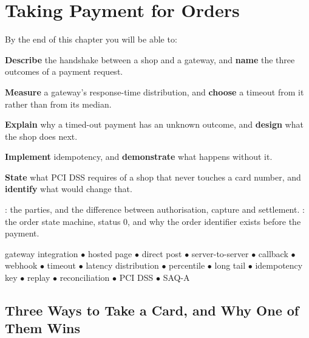 \chapter{Taking Payment for Orders}\label{ch:gateway}

\begin{outcomes}
By the end of this chapter you will be able to:
\begin{tight}
  \item \textbf{Describe} the handshake between a shop and a gateway, and
        \textbf{name} the three outcomes of a payment request.
  \item \textbf{Measure} a gateway's response-time distribution, and
        \textbf{choose} a timeout from it rather than from its median.
  \item \textbf{Explain} why a timed-out payment has an unknown outcome, and
        \textbf{design} what the shop does next.
  \item \textbf{Implement} idempotency, and \textbf{demonstrate} what happens
        without it.
  \item \textbf{State} what PCI DSS requires of a shop that never touches a
        card number, and \textbf{identify} what would change that.
\end{tight}
\end{outcomes}

\begin{prereq}
: the parties, and the difference between authorisation,
capture and settlement. : the order state machine, status 0,
and why the order identifier exists before the payment.
\end{prereq}

\begin{keyterms}
gateway integration $\bullet$ hosted page $\bullet$ direct post $\bullet$
server-to-server $\bullet$ callback $\bullet$ webhook $\bullet$ timeout
$\bullet$ latency distribution $\bullet$ percentile $\bullet$ long tail
$\bullet$ idempotency key $\bullet$ replay $\bullet$ reconciliation $\bullet$
PCI DSS $\bullet$ SAQ-A
\end{keyterms}

\section{Three Ways to Take a Card, and Why One of Them Wins}

